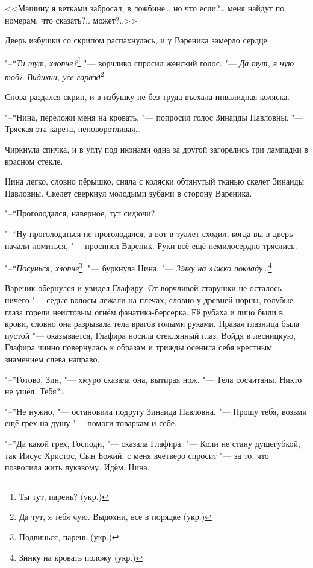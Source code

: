 <<Машину я ветками забросал, в ложбине\ldots{} но что если?.. меня найдут по номерам, что сказать?.. может?..>>

Дверь избушки со скрипом распахнулась, и у Вареника замерло сердце.

"--*\textit{Ти тут, хлопче?}\footnote{Ты тут, парень? (укр.)} "--- ворчливо спросил женский голос.
"--- \textit{Да тут, я чую тобi.}
\textit{Видихни, усе гаразд}\footnote{Да тут, я тебя чую. Выдохни, всё в порядке (укр.)}.

Снова раздался скрип, и в избушку не без труда въехала инвалидная коляска.

"--*Нина, переложи меня на кровать, "--- попросил голос Зинаиды Павловны.
"--- Тряская эта карета, неповоротливая\ldots{}

Чиркнула спичка, и в углу под иконами одна за другой загорелись три лампадки в красном стекле.

Нина легко, словно пёрышко, сняла с коляски обтянутый тканью скелет Зинаиды Павловны.
Скелет сверкнул молодыми зубами в сторону Вареника.

"--*Проголодался, наверное, тут сидючи?

"--*Ну проголодаться не проголодался, а вот в туалет сходил, когда вы в дверь начали ломиться, "--- просипел Вареник.
Руки всё ещё немилосердно тряслись.

"--*\textit{Посунься, хлопче}\footnote{Подвинься, парень (укр.)}, "--- буркнула Нина.
"--- \textit{Зiнку на лiжко покладу\ldots{}}\footnote{Зинку на кровать положу (укр.)}

\asterism

\textspace

Вареник обернулся и увидел Глафиру.
От ворчливой старушки не осталось ничего "--- седые волосы лежали на плечах, словно у древней норны, голубые глаза горели неистовым огнём фанатика-берсерка.
Её рубаха и лицо были в крови, словно она разрывала тела врагов голыми руками.
Правая глазница была пустой "--- оказывается, Глафира носила стеклянный глаз.
Войдя в лесницкую, Глафира чинно повернулась к образам и трижды осенила себя крестным знамением слева направо.

"--*Готово, Зин, "--- хмуро сказала она, вытирая нож.
"--- Тела сосчитаны.
Никто не ушёл.
Тебя?..

"--*Не нужно, "--- остановила подругу Зинаида Павловна.
"--- Прошу тебя, возьми ещё грех на душу "--- помоги товаркам и себе.

"--*Да какой грех, Господи, "--- сказала Глафира.
"--- Коли не стану душегубкой, так Иисус Христос, Сын Божий, с меня вчетверо спросит "--- за то, что позволила жить лукавому.
Идём, Нина.

